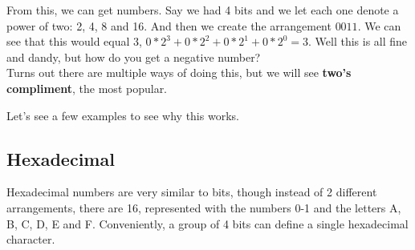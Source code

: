 \documentclass[12pt, twoside]{article}
\begin{document}
From this, we can get numbers.  Say we had 4 bits and we let each one denote a power of two: 2, 4, 8 and 16.  And then we create the arrangement $0011$.  We can see that this would equal 3, $0 * 2^3 + 0 * 2^2 + 0 * 2^1 + 0 * 2^0 = 3$.  Well this is all fine and dandy, but how do you get a negative number? \\
 
Turns out there are multiple ways of doing this, but we will see \textbf{two's compliment}, the most popular.

 
Let's see a few examples to see why this works. \\


\subsection{Hexadecimal}
Hexadecimal numbers are very similar to bits, though instead of 2 different arrangements, there are 16, represented with the numbers 0-1 and the letters A, B, C, D, E and F.  Conveniently, a group of 4 bits can define a single hexadecimal character. \\
\end{document}
